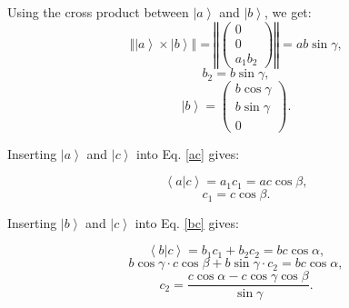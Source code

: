 Using the cross product between $\left| a \right>$ and $\left| b \right>$, we get:
\begin{equation} 
	\left\Vert \left| a \right> \times \left| b \right> \right\Vert =
	\left\Vert \left( \begin{array}{c} 0 \\ 0 \\ a_1 b_2 \end{array} \right) \right\Vert =
	ab \sin \gamma, \label{crossab}
\end{equation}
\begin{equation} b_2 = b \sin \gamma, \end{equation}
\begin{equation} 
\boxed{ \left| b \right> = \left( \begin{array}{c} b \cos \gamma \\ b \sin \gamma \\ 0 \end{array} \right). } 
\label{bvec} 
\end{equation}


Inserting $\left| a \right>$ and $\left| c \right>$ into Eq. \ref{ac} gives:

\begin{equation} \left< a | c \right > = a_1 c_1 = ac \cos \beta, \end{equation}
\begin{equation} c_1 = c \cos \beta. \end{equation}



Inserting $\left| b \right>$ and $\left| c \right>$ into Eq. \ref{bc} gives:

\begin{equation} \left< b | c \right > = b_1 c_1 + b_2 c_2 = bc \cos \alpha, \end{equation}
\begin{equation} b \cos \gamma \cdot c \cos \beta + b \sin \gamma \cdot c_2 = bc \cos \alpha, \end{equation}
\begin{equation} c_2 = \frac{c \cos \alpha - c \cos \gamma \cos \beta}{\sin \gamma}. \end{equation}



